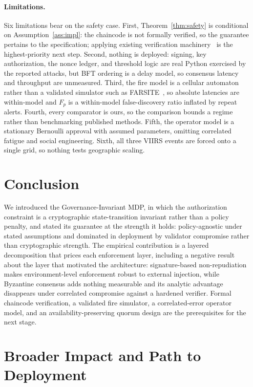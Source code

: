 \documentclass[letterpaper]{article} %
\begin{document}
\paragraph{Limitations.} Six limitations bear on the safety case. First, Theorem~\ref{thm:safety} is conditional on Assumption~\ref{ass:impl}: the chaincode is not formally verified, so the guarantee pertains to the specification; applying existing verification machinery~\citep{bhargavan2016} is the highest-priority next step. Second, nothing is deployed: signing, key authorization, the nonce ledger, and threshold logic are real Python exercised by the reported attacks, but BFT ordering is a delay model, so consensus latency and throughput are unmeasured. Third, the fire model is a cellular automaton rather than a validated simulator such as FARSITE~\citep{finney1998}, so absolute latencies are within-model and $F_p$ is a within-model false-discovery ratio inflated by repeat alerts. Fourth, every comparator is ours, so the comparison bounds a regime rather than benchmarking published methods. Fifth, the operator model is a stationary Bernoulli approval with assumed parameters, omitting correlated fatigue and social engineering. Sixth, all three VIIRS events are forced onto a single grid, so nothing tests geographic scaling.

\section{Conclusion}
\label{sec:conclusion}

We introduced the Governance-Invariant MDP, in which the authorization constraint is a cryptographic state-transition invariant rather than a policy penalty, and stated its guarantee at the strength it holds: policy-agnostic under stated assumptions and dominated in deployment by validator compromise rather than cryptographic strength. The empirical contribution is a layered decomposition that prices each enforcement layer, including a negative result about the layer that motivated the architecture: signature-based non-repudiation makes environment-level enforcement robust to external injection, while Byzantine consensus adds nothing measurable and its analytic advantage disappears under correlated compromise against a hardened verifier. Formal chaincode verification, a validated fire simulator, a correlated-error operator model, and an availability-preserving quorum design are the prerequisites for the next stage.

\section*{Broader Impact and Path to Deployment}
\label{sec:broader_impact}
\end{document}
